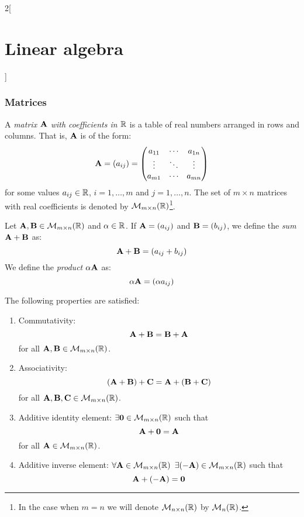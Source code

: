 \documentclass[../../../main.tex]{subfiles}
\begin{document}
\begin{multicols}{2}[\section{Linear algebra}]
  \subsubsection*{Matrices}
  \begin{definition}[Matrix]
    A \textit{matrix $\vb{A}$ with coefficients in $\mathbb{R}$} is a table of real numbers arranged in rows and columns. That is, $\vb{A}$ is of the form:
    \begin{equation*}
      \vb{A}=(a_{ij})=
      \begin{pmatrix}
        a_{11} & \cdots & a_{1n} \\
        \vdots & \ddots & \vdots \\
        a_{m1} & \cdots & a_{mn}
      \end{pmatrix}
    \end{equation*}
    for some values $a_{ij}\in\mathbb{R}$, $i=1,\ldots,m$ and $j=1,\ldots,n$. The set of $m\times n$ matrices with real coefficients is denoted by $\mathcal{M}_{m\times n}(\mathbb{R})$\footnote{In the case when $m=n$ we will denote $\mathcal{M}_{n\times n}(\mathbb{R})$ by $\mathcal{M}_n(\mathbb{R})$.}.
  \end{definition}
  \begin{definition}
    Let $\vb{A},\vb{B}\in\mathcal{M}_{m\times n}(\mathbb{R})$ and $\alpha\in\mathbb{R}$. If $\vb{A}=(a_{ij})$ and $\vb{B}=(b_{ij})$, we define the \textit{sum $\vb{A}+\vb{B}$} as: $$\vb{A}+\vb{B}=(a_{ij}+b_{ij})$$
    We define the \textit{product $\alpha\vb{A}$} as: $$\alpha\vb{A}=(\alpha a_{ij})$$
  \end{definition}
  \begin{prop}
    The following properties are satisfied:
    \begin{enumerate}
      \item Commutativity: $$\vb{A}+\vb{B}=\vb{B}+\vb{A}$$ for all $\vb{A},\vb{B}\in\mathcal{M}_{m\times n}(\mathbb{R})$.
      \item Associativity: $$(\vb{A}+\vb{B})+\vb{C}=\vb{A}+(\vb{B}+\vb{C})$$ for all $\vb{A},\vb{B},\vb{C}\in\mathcal{M}_{m\times n}(\mathbb{R})$.
      \item Additive identity element: $\exists\vb{0}\in\mathcal{M}_{m\times n}(\mathbb{R})$ such that $$\vb{A}+\vb{0}=\vb{A}$$ for all $\vb{A}\in\mathcal{M}_{m\times n}(\mathbb{R})$.
      \item Additive inverse element: $\forall\vb{A}\in\mathcal{M}_{m\times n}(\mathbb{R})$ $\exists(-\vb{A})\in\mathcal{M}_{m\times n}(\mathbb{R})$ such that $$\vb{A}+(-\vb{A})=\vb{0}$$

\end{enumerate}
\end{prop}
\end{multicols}
\end{document}
